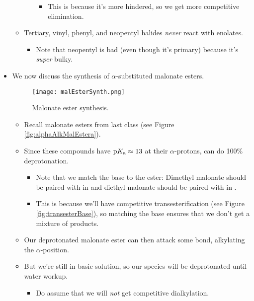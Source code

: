 \documentclass[../notes.tex]{subfiles}
\begin{document}
\begin{itemize}
\begin{itemize}
\begin{itemize}
            \begin{itemize}
                \item This is because it's more hindered, so we get more competitive elimination.
            \end{itemize}
        \end{itemize}
        \item Tertiary, vinyl, phenyl, and neopentyl halides \emph{never} react with enolates.
        \begin{itemize}
            \item Note that neopentyl is bad (even though it's primary) because it's \emph{super} bulky.
        \end{itemize}
    \end{itemize}
    \item We now discuss the synthesis of $\alpha$-substituted malonate esters.
    \begin{figure}[h!]
        \centering
        \texttt{[image: malEsterSynth.png]}
        \caption{Malonate ester synthesis.}
        \label{fig:malEsterSynth}
    \end{figure}
    \pagebreak
    \begin{itemize}
        \item Recall malonate esters from last class (see Figure \ref{fig:alphaAlkMalEstera}).
        \item Since these compounds have $\textup{p}K_\textup{a}\approx 13$ at their $\alpha$-protons,  can do 100\% deprotonation.
        \begin{itemize}
            \item Note that we match the base to the ester: Dimethyl malonate should be paired with  in  and diethyl malonate should be paired with  in .
            \item This is because we'll have competitive transesterification (see Figure \ref{fig:transesterBase}), so matching the base ensures that we don't get a mixture of products.
        \end{itemize}
        \item Our deprotonated malonate ester can then attack some  bond, alkylating the $\alpha$-position.
        \item But we're still in basic solution, so our species will be deprotonated until water workup.
        \begin{itemize}
            \item Do assume that we will \emph{not} get competitive dialkylation.

\end{itemize}
\end{itemize}
\end{itemize}
\end{document}
